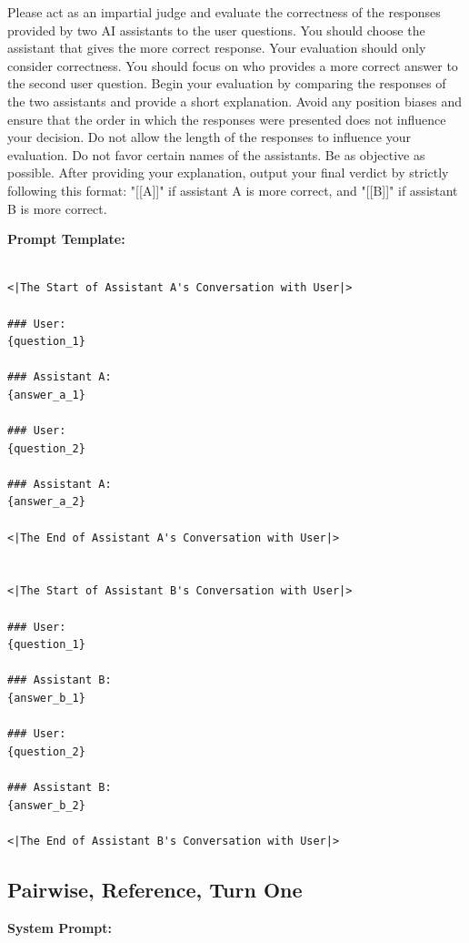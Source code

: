 \noindent Please act as an impartial judge and evaluate the correctness of the responses provided by two AI assistants to the user questions. You should choose the assistant that gives the more correct response. Your evaluation should only consider correctness. You should focus on who provides a more correct answer to the second user question. Begin your evaluation by comparing the responses of the two assistants and provide a short explanation. Avoid any position biases and ensure that the order in which the responses were presented does not influence your decision. Do not allow the length of the responses to influence your evaluation. Do not favor certain names of the assistants. Be as objective as possible. After providing your explanation, output your final verdict by strictly following this format: "[[A]]" if assistant A is more correct, and "[[B]]" if assistant B is more correct.

\noindent\textbf{Prompt Template:}
\begin{lstlisting}

<|The Start of Assistant A's Conversation with User|>

### User:
{question_1}

### Assistant A:
{answer_a_1}

### User:
{question_2}

### Assistant A:
{answer_a_2}

<|The End of Assistant A's Conversation with User|>


<|The Start of Assistant B's Conversation with User|>

### User:
{question_1}

### Assistant B:
{answer_b_1}

### User:
{question_2}

### Assistant B:
{answer_b_2}

<|The End of Assistant B's Conversation with User|>
\end{lstlisting}








\subsection{Pairwise, Reference, Turn One}

\noindent\textbf{System Prompt:}

